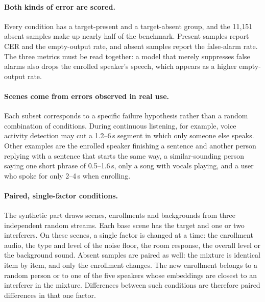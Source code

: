 \paragraph{Both kinds of error are scored.}
Every condition has a target-present and a target-absent group, and the 11{,}151 absent samples make up nearly half of the benchmark.
Present samples report CER and the empty-output rate, and absent samples report the false-alarm rate.
The three metrics must be read together: a model that merely suppresses false alarms also drops the enrolled speaker's speech, which appears as a higher empty-output rate.

\paragraph{Scenes come from errors observed in real use.}
Each subset corresponds to a specific failure hypothesis rather than a random combination of conditions.
During continuous listening, for example, voice activity detection may cut a 1.2--6\,s segment in which only someone else speaks.
Other examples are the enrolled speaker finishing a sentence and another person replying with a sentence that starts the same way, a similar-sounding person saying one short phrase of 0.5--1.6\,s, only a song with vocals playing, and a user who spoke for only 2--4\,s when enrolling.

\paragraph{Paired, single-factor conditions.}
The synthetic part draws scenes, enrollments and backgrounds from three independent random streams.
Each base scene has the target and one or two interferers.
On these scenes, a single factor is changed at a time: the enrollment audio, the type and level of the noise floor, the room response, the overall level or the background sound.
Absent samples are paired as well: the mixture is identical item by item, and only the enrollment changes.
The new enrollment belongs to a random person or to one of the five speakers whose embeddings are closest to an interferer in the mixture.
Differences between such conditions are therefore paired differences in that one factor.

